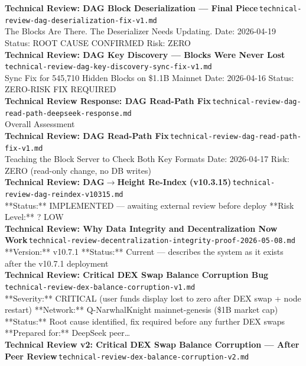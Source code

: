 \documentclass[11pt,a4paper]{article}
\begin{document}
\noindent\textbf{Technical Review: DAG Block Deserialization --- Final Piece}\,\textcolor{qgray}{\small \texttt{technical-review-dag-deserialization-fix-v1.md}}\\
The Blocks Are There. The Deserializer Needs Updating. Date: 2026-04-19 \textbar{} Status: ROOT CAUSE CONFIRMED \textbar{} Risk: ZERO\\[6pt]
\noindent\textbf{Technical Review: DAG Key Discovery --- Blocks Were Never Lost}\,\textcolor{qgray}{\small \texttt{technical-review-dag-key-discovery-sync-fix-v1.md}}\\
Sync Fix for 545,710 Hidden Blocks on \$1.1B Mainnet Date: 2026-04-16 \textbar{} Status: ZERO-RISK FIX REQUIRED\\[6pt]
\noindent\textbf{Technical Review Response: DAG Read-Path Fix}\,\textcolor{qgray}{\small \texttt{technical-review-dag-read-path-deepseek-response.md}}\\
Overall Assessment\\[6pt]
\noindent\textbf{Technical Review: DAG Read-Path Fix}\,\textcolor{qgray}{\small \texttt{technical-review-dag-read-path-fix-v1.md}}\\
Teaching the Block Server to Check Both Key Formats Date: 2026-04-17 \textbar{} Risk: ZERO (read-only change, no DB writes)\\[6pt]
\noindent\textbf{Technical Review: DAG$\rightarrow$Height Re-Index (v10.3.15)}\,\textcolor{qgray}{\small \texttt{technical-review-dag-reindex-v10315.md}}\\
**Status:** IMPLEMENTED --- awaiting external review before deploy **Risk Level:** ? LOW\\[6pt]
\noindent\textbf{Technical Review: Why Data Integrity and Decentralization Now Work}\,\textcolor{qgray}{\small \texttt{technical-review-decentralization-integrity-proof-2026-05-08.md}}\\
**Version:** v10.7.1 **Status:** Current --- describes the system as it exists after the v10.7.1 deployment\\[6pt]
\noindent\textbf{Technical Review: Critical DEX Swap Balance Corruption Bug}\,\textcolor{qgray}{\small \texttt{technical-review-dex-balance-corruption-v1.md}}\\
**Severity:** CRITICAL (user funds display lost to zero after DEX swap + node restart) **Network:** Q-NarwhalKnight mainnet-genesis (\$1B market cap) **Status:** Root cause identified, fix required before any further DEX swaps **Prepared for:** DeepSeek peer\ldots{}\\[6pt]
\noindent\textbf{Technical Review v2: Critical DEX Swap Balance Corruption --- After Peer Review}\,\textcolor{qgray}{\small \texttt{technical-review-dex-balance-corruption-v2.md}}\\
\end{document}
